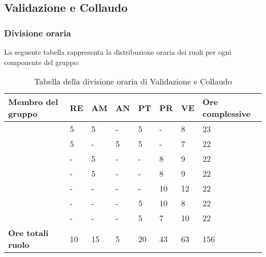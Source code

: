 \subsection{Validazione e Collaudo}

\subsubsection{Divisione oraria}
La seguente tabella rappresenta la distribuzione oraria dei ruoli per ogni componente del gruppo:
{

\renewcommand{\arraystretch}{2}
\begin{longtable}[h!] { C{4cm} C{1cm} C{1cm} C{1cm} C{1cm} C{1cm} C{1cm} C{3cm}}
\caption{Tabella della divisione oraria di Validazione e Collaudo}	\\
\rowcolor{\primaryColor}

\textcolor{\secondaryColor}{\textbf{Membro del gruppo}} & 
\textcolor{\secondaryColor}{\textbf{RE}} & 
\textcolor{\secondaryColor}{\textbf{AM}} & 
\textcolor{\secondaryColor}{\textbf{AN}} & 
\textcolor{\secondaryColor}{\textbf{PT}} & 
\textcolor{\secondaryColor}{\textbf{PR}} & 
\textcolor{\secondaryColor}{\textbf{VE}} & 
\textcolor{\secondaryColor}{\textbf{Ore complessive}}\\	
\endhead

\AW{}                     &  5 &  5 &  - & 5 & - & 8 & 23 \\
\AT{}                     &  5 &  - &  5 & 5 & - & 7 & 22 \\
\AD{}                     &  - &  5 &  - & - & 8 & 9 & 22 \\
\EC{}                     &  - &  5 &  - & - & 8 & 9 & 22 \\
\EM{}                     &  - &  - &  - & - & 10 & 12 & 22 \\
\FP{}                     &  - &  - &  - & 5 & 10 & 8 & 22 \\
\GG{}                     &  - &  - &  - & 5 & 7 & 10 & 22 \\
\textbf{Ore totali ruolo} & 10 & 15 & 5 & 20 & 43 & 63 & 156 \\

\end{longtable}
}


